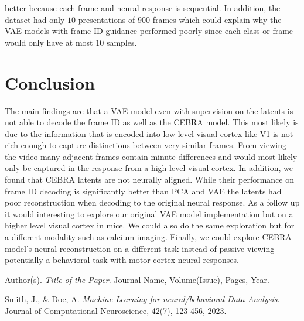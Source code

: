 \documentclass[12pt, letterpaper]{article}
\begin{document}
better because each frame and neural response is sequential. In addition, the dataset had only $10$ presentations of $900$ frames which could explain why the VAE models with frame ID guidance performed poorly since each class or frame would only have at most $10$ samples. 

\section{Conclusion}
\label{sec:conclusion}
The main findings are that a VAE model even with supervision on the latents is not able to decode the frame ID as well as the CEBRA model. This most likely is due to the information that is encoded into low-level visual cortex like V1 is not rich enough to capture distinctions between very similar frames. From viewing the video many adjacent frames contain minute differences and would most likely only be captured in the response from a high level visual cortex. In addition, we found that CEBRA latents are not neurally aligned. While their performance on frame ID decoding is significantly better than PCA and VAE the latents had poor reconstruction when decoding to the original neural response. As a follow up it would interesting to explore our original VAE model implementation but on a higher level visual cortex in mice. We could also do the same exploration but for a different modality such as calcium imaging. Finally, we could explore CEBRA model's neural reconstruction on a different task instead of passive viewing potentially a behavioral task with motor cortex neural responses. 

\newpage
\begin{thebibliography}{9}
    Author(s). \textit{Title of the Paper}. Journal Name, Volume(Issue), Pages, Year.
    
    Smith, J., \& Doe, A. \textit{Machine Learning for neural/behavioral Data Analysis}. Journal of Computational Neuroscience, 42(7), 123-456, 2023.
\end{thebibliography}
\end{document}
